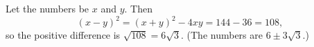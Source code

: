 Let the numbers be $x$ and $y$. Then
\[
(x-y)^2=(x+y)^2-4xy=144-36=108,
\]
so the positive difference is $\sqrt{108}=\boxed{6\sqrt3}$. (The numbers are $6\pm3\sqrt3$.)

